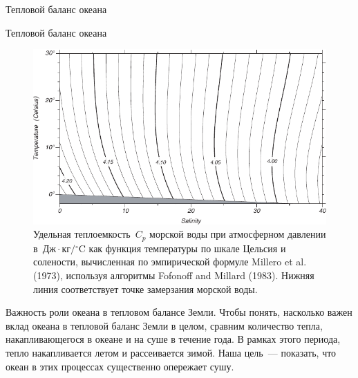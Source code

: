 \begin{chapter}{Тепловой баланс океана}
\begin{section}{Тепловой баланс океана}
\begin{figure}[t!]
\includegraphics{pics/Cp}
\caption{Удельная теплоемкость~$C_{p}$ морской воды при атмосферном давлении
в~$\text{Дж} \cdot \text{кг} / {}^\circ \text{C}$ как функция 
температуры по шкале Цельсия и солености, вычисленная по эмпирической 
формуле Millero et al. (1973), используя алгоритмы Fofonoff and Millard (1983). 
Нижняя линия соответствует точке замерзания морской воды.}
\label{fig:Cp}
\end{figure}
%

\begin{paragraph}{Важность роли океана в тепловом балансе Земли.}
Чтобы понять, насколько важен вклад океана в тепловой баланс Земли в целом,
сравним количество тепла, накапливающегося в океане и на суше в течение года.
В рамках этого периода, тепло накапливается летом и рассеивается зимой.
Наша цель~--- показать, что океан в этих процессах существенно опережает сушу.
%


\end{paragraph}
\end{section}
\end{chapter}
